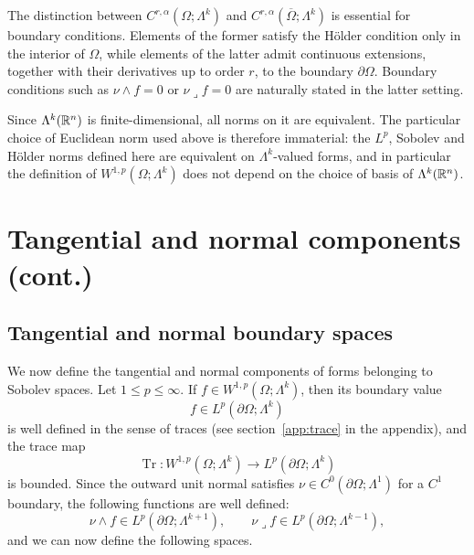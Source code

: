 \begin{remark}
The distinction between $C^{r,\alpha}(\Omega;\Lambda^k)$ and
$C^{r,\alpha}(\overline\Omega;\Lambda^k)$ is essential for boundary conditions. Elements of the former satisfy the H\"older condition only in the interior of $\Omega$, while elements of the latter admit continuous extensions, together with their derivatives up to order $r$, to the boundary $\partial\Omega$. Boundary conditions such as $\nu\wedge f=0$ or $\nu\lrcorner f=0$ are naturally stated in the latter setting.
\end{remark}

\begin{remark}
Since $\Lambda^k(\mathbb{R}^n)$ is finite-dimensional, all norms on it are equivalent. The particular choice of Euclidean norm used above is therefore immaterial: the $L^p$, Sobolev and H\"older norms defined here are equivalent on $\Lambda^k$-valued forms, and in particular the definition of $W^{1,p}(\Omega;\Lambda^k)$ does not depend on the choice of basis of $\Lambda^k(\mathbb{R}^n)$.
\end{remark}

\section{Tangential and normal components (cont.)}
\subsection{Tangential and normal boundary spaces}
\label{subsec:tangential-normal-spaces}

We now define the tangential and normal components of forms belonging to Sobolev spaces. Let $1\leq p\leq\infty$. If $f\in W^{1,p}(\Omega;\Lambda^k)$, then its boundary value
\[
    f\in L^p(\partial\Omega;\Lambda^k)
\]
is well defined in the sense of traces (see section~\ref{app:trace} in the appendix), and the trace map
\[
    \operatorname{Tr}:W^{1,p}(\Omega;\Lambda^k)
    \longrightarrow
    L^p(\partial\Omega;\Lambda^k)
\]
is bounded. Since the outward unit normal satisfies
$\nu\in C^0(\partial\Omega;\Lambda^1)$ for a $C^1$ boundary, the following
functions are well defined:
\[
    \nu\wedge f\in L^p(\partial\Omega;\Lambda^{k+1}),
    \qquad
    \nu\lrcorner f\in L^p(\partial\Omega;\Lambda^{k-1}),
\]
and we can now define the following spaces.

